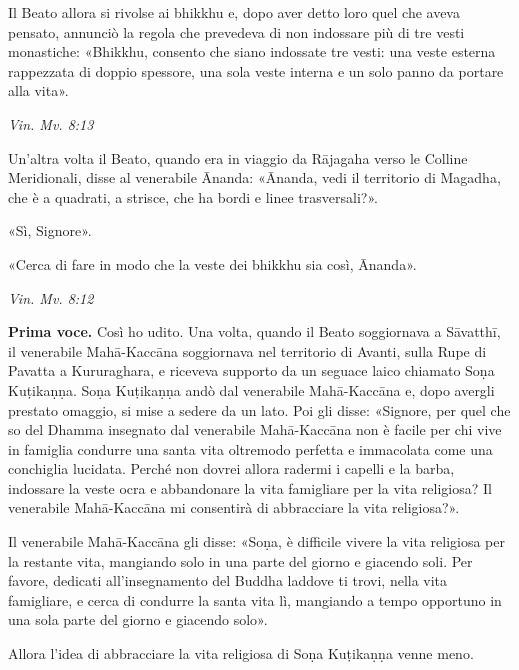 Il Beato allora si rivolse ai bhikkhu e, dopo aver detto loro quel che
aveva pensato, annunciò la regola che prevedeva di non indossare più di
tre vesti monastiche: «Bhikkhu, consento che siano indossate tre vesti:
una veste esterna rappezzata di doppio spessore, una sola veste interna
e un solo panno da portare alla vita».


\emph{Vin. Mv. 8:13}


Un’altra volta il Beato, quando era in viaggio da Rājagaha verso le
Colline Meridionali, disse al venerabile Ānanda: «Ānanda, vedi il
territorio di Magadha, che è a quadrati, a strisce, che ha bordi e linee
trasversali?».


«Sì, Signore».


«Cerca di fare in modo che la veste dei bhikkhu sia così, Ānanda».


\emph{Vin. Mv. 8:12}


\textbf{Prima voce.} Così ho udito. Una volta, quando il Beato soggiornava a
Sāvatthī, il venerabile Mahā-Kaccāna soggiornava nel territorio di
Avanti, sulla Rupe di Pavatta a Kururaghara, e riceveva supporto da un
seguace laico chiamato Soṇa Kuṭikaṇṇa. Soṇa Kuṭikaṇṇa andò dal
venerabile Mahā-Kaccāna e, dopo avergli prestato omaggio, si mise a
sedere da un lato. Poi gli disse: «Signore, per quel che so del Dhamma
insegnato dal venerabile Mahā-Kaccāna non è facile per chi vive in
famiglia condurre una santa vita oltremodo perfetta e immacolata come
una conchiglia lucidata. Perché non dovrei allora radermi i capelli e la
barba, indossare la veste ocra e abbandonare la vita famigliare per la
vita religiosa? Il venerabile Mahā-Kaccāna mi consentirà di abbracciare
la vita religiosa?».


Il venerabile Mahā-Kaccāna gli disse: «Soṇa, è difficile vivere la vita
religiosa per la restante vita, mangiando solo in una parte del giorno e
giacendo soli. Per favore, dedicati all’insegnamento del Buddha laddove
ti trovi, nella vita famigliare, e cerca di condurre la santa vita lì,
mangiando a tempo opportuno in una sola parte del giorno e giacendo
solo».


Allora l’idea di abbracciare la vita religiosa di Soṇa Kuṭikaṇṇa venne
meno.


